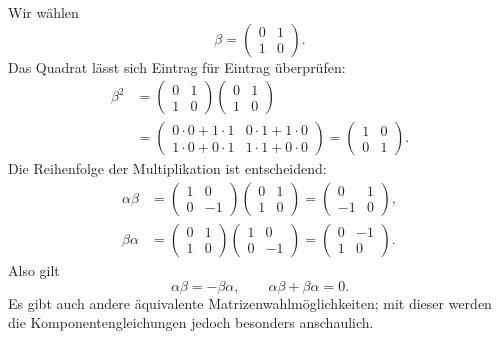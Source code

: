 Wir wählen
\begin{equation}
\beta=
\begin{pmatrix}
0&1\\
1&0
\end{pmatrix}.
\end{equation}
Das Quadrat lässt sich Eintrag für Eintrag überprüfen:
\begin{equation}
\begin{aligned}
\beta^2
&=
\begin{pmatrix}
0&1\\
1&0
\end{pmatrix}
\begin{pmatrix}
0&1\\
1&0
\end{pmatrix}\\
&=
\begin{pmatrix}
0\cdot0+1\cdot1&0\cdot1+1\cdot0\\
1\cdot0+0\cdot1&1\cdot1+0\cdot0
\end{pmatrix}
=
\begin{pmatrix}
1&0\\
0&1
\end{pmatrix}.
\end{aligned}
\end{equation}
Die Reihenfolge der Multiplikation ist entscheidend:
\begin{align}
\alpha\beta
&=
\begin{pmatrix}
1&0\\
0&-1
\end{pmatrix}
\begin{pmatrix}
0&1\\
1&0
\end{pmatrix}
=
\begin{pmatrix}
0&1\\
-1&0
\end{pmatrix},\\
\beta\alpha
&=
\begin{pmatrix}
0&1\\
1&0
\end{pmatrix}
\begin{pmatrix}
1&0\\
0&-1
\end{pmatrix}
=
\begin{pmatrix}
0&-1\\
1&0
\end{pmatrix}.
\end{align}
Also gilt
\begin{equation}
\alpha\beta=-\beta\alpha,
\qquad
\alpha\beta+\beta\alpha=0.
\end{equation}
Es gibt auch andere äquivalente Matrizenwahlmöglichkeiten; mit dieser werden die Komponentengleichungen jedoch besonders anschaulich.

